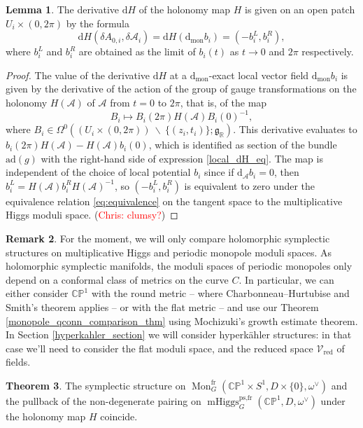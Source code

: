 \documentclass[11pt, oneside, reqno]{amsart}
\theoremstyle{definition} \newtheorem{definition}{Definition}[section]
\newtheorem{lemma}[definition]{Lemma}
\newtheorem{theorem}[definition]{Theorem}
\theoremstyle{definition} \newtheorem{remark}[definition]{Remark}
\theoremstyle{definition} \newtheorem{remarks}[definition]{Remarks}
\theoremstyle{definition} \newtheorem{question}[definition]{Question}
\theoremstyle{definition} \newtheorem*{note}{Note}
\theoremstyle{definition} \newtheorem{example}[definition]{Example}
\theoremstyle{definition} \newtheorem{examples}[definition]{Examples}
\renewcommand{\gg}{\mathfrak{g}}
\newcommand{\bb}[1]{\mathbb{#1}}
\newcommand{\mr}[1]{\mathrm{#1}}
\newcommand{\mc}[1]{\mathcal{#1}}
\newcommand{\bs}{\ \backslash \ }
\newcommand{\RR}{\mathbb{R}}
\DeclareMathOperator{\mhiggs}{mHiggs}
\DeclareMathOperator{\mon}{Mon}
\renewcommand{\d}{\mathrm{d}}
\newcommand{\fr}{\mathrm{fr}}
\newcommand{\red}{\mathrm{red}}
\newcommand{\ad}{\mr{ad}}
\newcommand{\chris}[1]{(\textcolor{red}{Chris: #1})}
\begin{document}
\begin{lemma} \label{local_derivative_description_lemma}
The derivative $\d H$ of the holonomy map $H$ is given on an open patch $U_i \times (0,2\pi)$ by the formula
\begin{equation}
\label{local_dH_eq}
\d H(\delta A_{0,i}, \delta \mc A_i) = \d H(\d_{\mr{mon}} b_i) = (- b_i^L, b_i^R),
\end{equation}
where $b_i^L$ and $b_i^R$ are obtained as the limit of $b_i(t)$ as $t \to 0$ and $2\pi$ respectively.
\end{lemma}

\begin{proof}
The value of the derivative $\d H$ at a $\d_{\mr{mon}}$-exact local vector field $\d_{\mr{mon}} b_i$ is given by the derivative of the action of the group of gauge transformations on the holonomy $H(\mc A)$ of $\mc A$ from $t=0$ to $2\pi$, that is, of the map 
\[B_i \mapsto B_i(2\pi)H(\mc A)B_i(0)^{-1},\]
where $B_i \in \Omega^0((U_i \times (0,2\pi)) \bs \{(z_i, t_i)\}; \gg_\RR)$.  This derivative evaluates to $b_i(2\pi) H(\mc A) - H(\mc A)b_i(0)$, which is identified as section of the bundle $\ad(g)$ with the right-hand side of expression \ref{local_dH_eq}.  The map is independent of the choice of local potential $b_i$ since if $\d_{\mc A} b_i = 0$, then $b_i^L = H(\mc A) b_i^R H(\mc A)^{-1}$, so $(-b_i^L, b_i^R)$ is equivalent to zero under the equivalence relation \ref{eq:equivalence} on the tangent space to the multiplicative Higgs moduli space. \chris{clumsy?}
\end{proof}

\begin{remark}
For the moment, we will only compare holomorphic symplectic structures on multiplicative Higgs and periodic monopole moduli spaces.  As holomorphic symplectic manifolds, the moduli spaces of periodic monopoles only depend on a conformal class of metrics on the curve $C$.  In particular, we can either consider $\bb{CP}^1$ with the round metric -- where Charbonneau--Hurtubise and Smith's theorem applies -- or with the flat metric -- and use our Theorem \ref{monopole_qconn_comparison_thm} using Mochizuki's growth estimate theorem.  In Section \ref{hyperkahler_section} we will consider hyperk\"ahler structures: in that case we'll need to consider the flat moduli space, and the reduced space $\mc V_{\red}$ of fields.
\end{remark}

\begin{theorem} \label{symplectic_comparison_thm}
The symplectic structure on $\mon_G^\fr(\bb{CP}^1 \times S^1,D \times\{0\},\omega^\vee)$ and the pullback of the non-degenerate pairing on $\mhiggs_G^{\text{ps,fr}}(\bb{CP}^1,D,\omega^\vee)$ under the holonomy map $H$ coincide.
\end{theorem}
\end{document}

